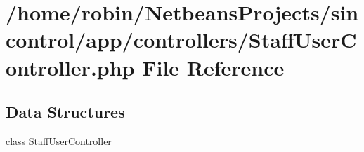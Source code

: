\hypertarget{_staff_user_controller_8php}{}\section{/home/robin/\+Netbeans\+Projects/sincontrol/app/controllers/\+Staff\+User\+Controller.php File Reference}
\label{_staff_user_controller_8php}
\subsection*{Data Structures}
\begin{DoxyCompactItemize}
\item 
class \hyperlink{class_staff_user_controller}{Staff\+User\+Controller}
\end{DoxyCompactItemize}
